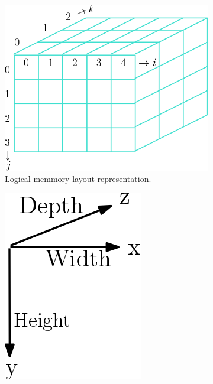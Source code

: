 \begin{figure}[htp]
  \centering
  \begin{subfigure}[b]{0.35\textwidth}
    \includegraphics[width=\textwidth]{img/array3D}
    \caption{Logical memmory layout representation.}
  \label{fig:3a}
  \end{subfigure}
  \hspace*{4cm}
  \begin{subfigure}[b]{0.2\textwidth}
    \includegraphics[width=\textwidth]{img/arrow3D}

\end{subfigure}
\end{figure}
